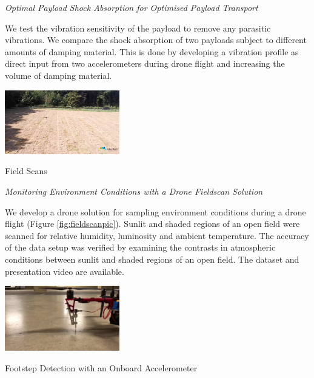\textit{Optimal Payload Shock Absorption for Optimised Payload Transport}

We test the vibration sensitivity of the payload to remove any parasitic vibrations. We compare the shock absorption of two payloads subject to different amounts of damping material. This is done by developing a vibration profile as direct input from two accelerometers during drone flight and increasing the volume of damping material. 

\begin{marginfigure}%
    \raggedright
    \includegraphics[width=5cm]{images/stage_graphs/environment_results/Flight_Drone.png}
    \caption{Field Scans}
    \label{fig:fieldscanpic}
\end{marginfigure}

\textit{Monitoring Environment Conditions with a Drone Fieldscan Solution}

We develop a drone solution for sampling environment conditions during a drone flight (Figure \ref{fig:fieldscanpic}). Sunlit and shaded regions of an open field were scanned for relative humidity, luminosity and ambient temperature. The accuracy of the data setup was verified by examining the contrasts in atmospheric conditions between sunlit and shaded regions of an open field. The dataset \cite{fieldscan_dataset} and presentation video \cite{fieldscan_video} are available.


\begin{marginfigure}%
    \raggedright
    \includegraphics[width=5cm]{images/stage_graphs/vibration_results/measure_road.png}
    \caption{Footstep Detection with an Onboard Accelerometer}
    \label{fig:footstep_setup}
\end{marginfigure}

